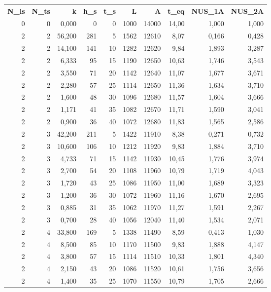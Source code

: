 \begin{tabular}{rrrrrrrrrr}
\toprule
N_ls & N_ts & k & h_s & t_s & L & A & t_eq & NUS_1A & NUS_2A \\ \hline
\midrule
0 & 0 & 0,000 & 0 & 0 & 1000 & 14000 & 14,00 & 1,000 & 1,000 \\ \hline
2 & 2 & 56,200 & 281 & 5 & 1562 & 12610 & 8,07 & 0,166 & 0,428 \\ \hline
2 & 2 & 14,100 & 141 & 10 & 1282 & 12620 & 9,84 & 1,893 & 3,287 \\ \hline
2 & 2 & 6,333 & 95 & 15 & 1190 & 12650 & 10,63 & 1,746 & 3,543 \\ \hline
2 & 2 & 3,550 & 71 & 20 & 1142 & 12640 & 11,07 & 1,677 & 3,671 \\ \hline
2 & 2 & 2,280 & 57 & 25 & 1114 & 12650 & 11,36 & 1,634 & 3,710 \\ \hline
2 & 2 & 1,600 & 48 & 30 & 1096 & 12680 & 11,57 & 1,604 & 3,666 \\ \hline
2 & 2 & 1,171 & 41 & 35 & 1082 & 12670 & 11,71 & 1,590 & 3,041 \\ \hline
2 & 2 & 0,900 & 36 & 40 & 1072 & 12680 & 11,83 & 1,565 & 2,586 \\ \hline
2 & 3 & 42,200 & 211 & 5 & 1422 & 11910 & 8,38 & 0,271 & 0,732 \\ \hline
2 & 3 & 10,600 & 106 & 10 & 1212 & 11920 & 9,83 & 1,884 & 3,710 \\ \hline
2 & 3 & 4,733 & 71 & 15 & 1142 & 11930 & 10,45 & 1,776 & 3,974 \\ \hline
2 & 3 & 2,700 & 54 & 20 & 1108 & 11960 & 10,79 & 1,719 & 4,043 \\ \hline
2 & 3 & 1,720 & 43 & 25 & 1086 & 11950 & 11,00 & 1,689 & 3,323 \\ \hline
2 & 3 & 1,200 & 36 & 30 & 1072 & 11960 & 11,16 & 1,670 & 2,695 \\ \hline
2 & 3 & 0,885 & 31 & 35 & 1062 & 11970 & 11,27 & 1,591 & 2,267 \\ \hline
2 & 3 & 0,700 & 28 & 40 & 1056 & 12040 & 11,40 & 1,534 & 2,071 \\ \hline
2 & 4 & 33,800 & 169 & 5 & 1338 & 11490 & 8,59 & 0,413 & 1,030 \\ \hline
2 & 4 & 8,500 & 85 & 10 & 1170 & 11500 & 9,83 & 1,888 & 4,147 \\ \hline
2 & 4 & 3,800 & 57 & 15 & 1114 & 11510 & 10,33 & 1,801 & 4,340 \\ \hline
2 & 4 & 2,150 & 43 & 20 & 1086 & 11520 & 10,61 & 1,756 & 3,656 \\ \hline
2 & 4 & 1,400 & 35 & 25 & 1070 & 11550 & 10,79 & 1,705 & 2,666 \\ \hline

\end{tabular}
